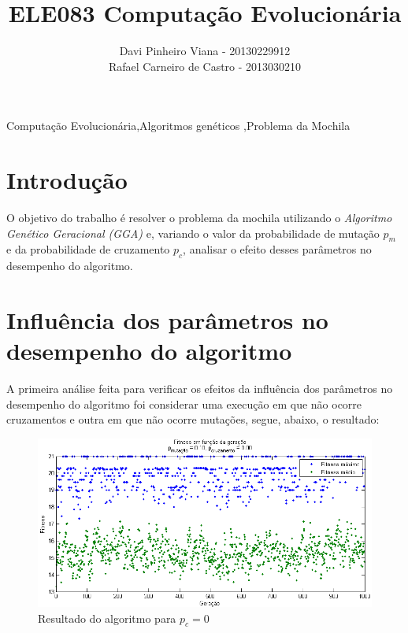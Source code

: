 \documentclass[12pt]{elsarticle}
\begin{document}
	\begin{frontmatter}

		\title{ELE083 Computação Evolucionária\\ }
		\author{Davi Pinheiro Viana - 20130229912\\Rafael Carneiro de Castro - 2013030210}
		\address{Minas Gerais, Brasil}
		
		\begin{keyword}
			Computação Evolucionária\sep Algoritmos genéticos \sep Problema da Mochila
		\end{keyword}
	\end{frontmatter}
	
	\section{Introdução}
	O objetivo do trabalho é resolver o problema da mochila utilizando o \emph{Algoritmo Genético Geracional (GGA)} e, variando o valor da probabilidade de mutação $p_m$ e da probabilidade de cruzamento $p_c$, analisar o efeito desses parâmetros no desempenho do algoritmo.

	\section{Influência dos parâmetros no desempenho do algoritmo}
	A primeira análise feita para verificar os efeitos da influência dos parâmetros no desempenho do algoritmo foi considerar uma execução em que não ocorre cruzamentos e outra em que não ocorre mutações, segue, abaixo, o resultado:
	\begin{figure}[h]
		\centering
		\includegraphics[width=15cm]{img/pc_0.png}
		\caption{Resultado do algoritmo para $p_{c}=0$}
		\label{fig:pc_0}
	\end{figure}
	
\end{document}
